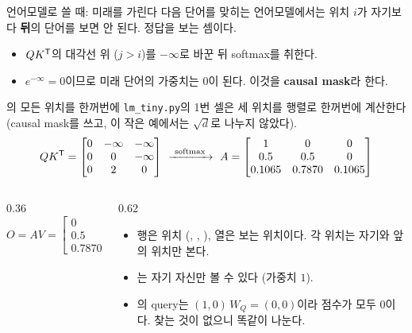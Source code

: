 \documentclass[aspectratio=169,11pt]{beamer}
\begin{document}
\begin{frame}{언어모델로 쓸 때: 미래를 가린다}
다음 단어를 맞히는 언어모델에서는 위치 $i$가 자기보다 \textbf{뒤}의 단어를 보면 안 된다.
정답을 보는 셈이다.
\begin{itemize}
\item $QK^{\mathsf T}$의 대각선 위 ($j>i$)를 $-\infty$로 바꾼 뒤 softmax를 취한다.
\item $e^{-\infty}=0$이므로 미래 단어의 가중치는 $0$이 된다.
  이것을 \textbf{causal mask}라 한다.
\end{itemize}
\end{frame}

\begin{frame}{의 모든 위치를 한꺼번에}
\texttt{lm\_tiny.py}의 1번 셀은 세 위치를 행렬로 한꺼번에 계산한다
(causal mask를 쓰고, 이 작은 예에서는 $\sqrt d$로 나누지 않았다).
\[
QK^{\mathsf T}=\begin{bmatrix}0&-\infty&-\infty\\0&0&-\infty\\0&2&0\end{bmatrix}
\ \xrightarrow{\ \operatorname{softmax}\ }\
A=\begin{bmatrix}1&0&0\\0.5&0.5&0\\0.1065&0.7870&0.1065\end{bmatrix}
\]
\begin{columns}[c,onlytextwidth]
\begin{column}{0.36\textwidth}
\[
O=AV=\begin{bmatrix}0&0\\0.5&0\\0.7870&0.1065\end{bmatrix}
\]
\end{column}
\begin{column}{0.62\textwidth}
\begin{itemize}
\item 행은 위치 (, , ), 열은 보는 위치이다.
  각 위치는 자기와 앞의 위치만 본다.
\item {}는 자기 자신만 볼 수 있다 (가중치 $1$).
\item {}의 query는 $(1,0)\,W_Q=(0,0)$이라 점수가 모두 $0$이다.
  찾는 것이 없으니 똑같이 나눈다.
\end{itemize}
\end{column}
\end{columns}
\end{frame}
\end{document}
